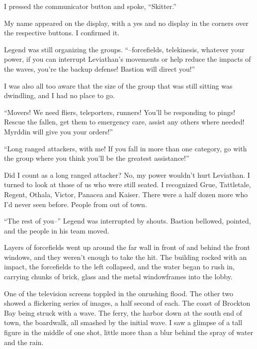 I pressed the communicator button and spoke, ``Skitter.''



My name appeared on the display, with a yes and no display in the corners over the respective buttons.  I confirmed it.



Legend was still organizing the groups.  ``--forcefields, telekinesis, whatever your power, if you can interrupt Leviathan's movements or help reduce the impacts of the waves, you're the backup defense!  Bastion will direct you!''



I was also all too aware that the size of the group that was still sitting was dwindling, and I had no place to go.



``Movers!  We need fliers, teleporters, runners!  You'll be responding to pings!  Rescue the fallen, get them to emergency care, assist any others where needed!  Myrddin will give you your orders!''



``Long ranged attackers, with me!  If you fall in more than one category, go with the group where you think you'll be the greatest assistance!''



Did I count as a long ranged attacker?  No, my power wouldn't hurt Leviathan.  I turned to look at those of us who were still seated.  I recognized Grue, Tattletale, Regent, Othala, Victor, Panacea and Kaiser.  There were a half dozen more who I'd never seen before.  People from out of town.



``The rest of you--'' Legend was interrupted by shouts.  Bastion bellowed, pointed, and the people in his team moved.



Layers of forcefields went up around the far wall in front of and behind the front windows, and they weren't enough to take the hit.  The building rocked with an impact, the forcefields to the left collapsed, and the water began to rush in, carrying chunks of brick, glass and the metal windowframes into the lobby.



One of the television screens toppled in the onrushing flood.  The other two showed a flickering series of images, a half second of each.  The coast of Brockton Bay being struck with a wave.  The ferry, the harbor down at the south end of town, the boardwalk, all smashed by the initial wave.  I saw a glimpse of a tall figure in the middle of one shot, little more than a blur behind the spray of water and the rain.



